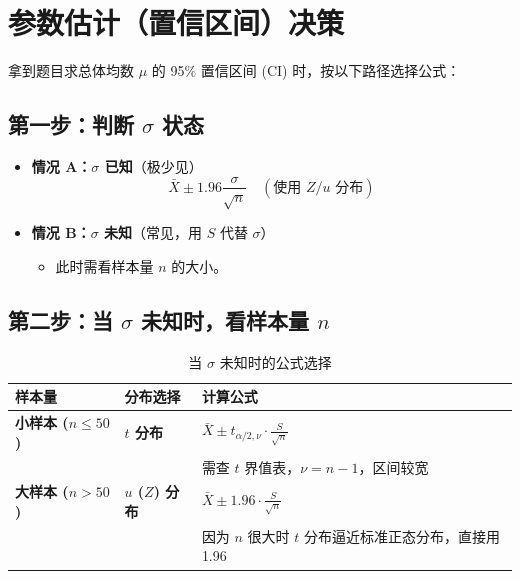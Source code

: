 \documentclass[lang=cn,10pt]{elegantbook}
\begin{document}
\section{参数估计（置信区间）决策}

拿到题目求总体均数 $\mu$ 的 95\% 置信区间 (CI) 时，按以下路径选择公式：

\subsection{第一步：判断 $\sigma$ 状态}

\begin{itemize}
    \item \textbf{情况 A：$\sigma$ 已知}（极少见）
    \begin{equation}
        \bar{X} \pm 1.96 \frac{\sigma}{\sqrt{n}} \quad (\text{使用 } Z/u \text{ 分布})
    \end{equation}
    
    \item \textbf{情况 B：$\sigma$ 未知}（常见，用 $S$ 代替 $\sigma$）
    \begin{itemize}
        \item 此时需看样本量 $n$ 的大小。
    \end{itemize}
\end{itemize}

\subsection{第二步：当 $\sigma$ 未知时，看样本量 $n$}

\begin{table}[htbp]
    \centering
    \caption{当 $\sigma$ 未知时的公式选择}
    \begin{tabular}{llp{5cm}}
        \toprule
        \textbf{样本量} & \textbf{分布选择} & \textbf{计算公式} \\
        \midrule
        \textbf{小样本 ($n \le 50$)} & \textbf{$t$ 分布} & $\displaystyle \bar{X} \pm t_{\alpha/2, \nu} \cdot \frac{S}{\sqrt{n}}$ \\
         & & \small{需查 $t$ 界值表，$\nu=n-1$，区间较宽} \\
        \midrule
        \textbf{大样本 ($n > 50$)} & \textbf{$u$ ($Z$) 分布} & $\displaystyle \bar{X} \pm 1.96 \cdot \frac{S}{\sqrt{n}}$ \\
         & & \small{因为 $n$ 很大时 $t$ 分布逼近标准正态分布，直接用 1.96} \\
        \bottomrule
    \end{tabular}
\end{table}
\end{document}
